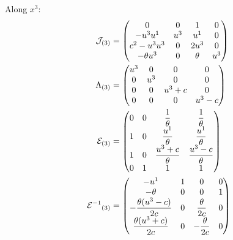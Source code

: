 \documentclass{article}
\begin{document}
Along $x^3$:
\begin{align}
    \mathcal{J}_{(3)} &= \left(
        \begin{matrix}
            0 & 0 & 1 & 0 \\
            -u^3u^1 & u^3 & u^1 & 0 \\ 
            c^2 -u^3 u^3 & 0 & 2u^3 & 0 \\
            -\theta u^3 & 0 & \theta & u^3
        \end{matrix}
        \right) \\
    \Lambda_{(3)} &= \left(
        \begin{matrix}
            u^3 & 0 & 0 & 0 \\
            0 & u^3 & 0 & 0 \\
            0 & 0 & u^3 + c & 0 \\
            0 & 0 & 0 & u^3 - c
        \end{matrix}
        \right) \\
    \mathcal{E}_{(3)} &= \left(
        \begin{matrix}
            0 & 0 & \dfrac{1}{\theta} & \dfrac{1}{\theta} \\
            1 & 0 & \dfrac{u^1}{\theta} & \dfrac{u^1}{\theta} \\
            1 & 0 & \dfrac{u^3+c}{\theta} & \dfrac{u^3-c}{\theta} \\
            0 & 1 & 1 & 1
        \end{matrix}
        \right) \\
    {{\mathcal{E}}^{-1}}_{(3)} &= \left(
        \begin{matrix}
            -u^1 & 1 & 0 & 0 \\
            -\theta & 0 & 0 & 1 \\
            -\dfrac{\theta(u^3 - c)}{2c} & 0 & \dfrac{\theta}{2c} & 0 \\
            \dfrac{\theta(u^3 + c)}{2c} & 0 & -\dfrac{\theta}{2c} & 0
        \end{matrix}
        \right)
\end{align}

\glsaddallunused
\printglossaries
\end{document}
